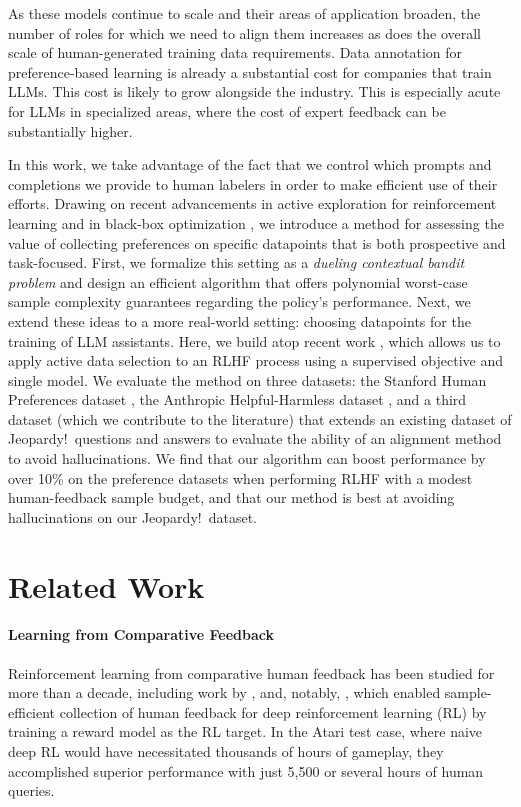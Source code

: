 \documentclass{article} \usepackage{iclr2023_conference,times}
\begin{document}
As these models continue to scale and their areas of application broaden, the number of roles for which we need to align them increases as does the overall scale of human-generated training data requirements.
Data annotation for preference-based learning is already a substantial cost for companies that train LLMs.
This cost is likely to grow alongside the industry.
This is especially acute for LLMs in specialized areas, where the cost of expert feedback can be substantially higher.



In this work, we take advantage of the fact that we control which prompts and completions we provide to human labelers in order to make efficient use of their efforts.
Drawing on recent advancements in active exploration for reinforcement learning \citep{li2023nearoptimal} and in black-box optimization \citep{xu2020zeroth}, we introduce a method for assessing the value of collecting preferences on specific datapoints that is both prospective and task-focused.
First, we formalize this setting as a \emph{dueling contextual bandit problem} and design an efficient algorithm that offers polynomial worst-case sample complexity guarantees regarding the policy's performance. 
Next, we extend these ideas to a more real-world setting: choosing datapoints for the training of LLM assistants.
Here, we build atop recent work \citep{dpo},
which allows us to apply active data selection to an RLHF process using a supervised objective and single model.
We evaluate the method on three datasets: the Stanford Human Preferences dataset \citep{pmlr-v162-ethayarajh22a}, the Anthropic Helpful-Harmless dataset \citep{bai2022training}, and a third dataset (which we contribute to the literature) that extends an existing dataset of Jeopardy!\ questions and answers to
evaluate the ability of an alignment method to avoid hallucinations. We find that our algorithm can boost performance by over 10\% on the preference datasets when performing RLHF with a modest human-feedback sample budget, and that our method is best at avoiding hallucinations on our Jeopardy!\ dataset.




%
 \vspace{-2mm}
\section{Related Work}
\vspace{-2mm}

\paragraph{Learning from Comparative Feedback}
Reinforcement learning from comparative human feedback has been studied for more than a decade, including work by \citet{furnkranzPreferenceRL}, \citet{akhourRobustPreferenceRL} and, notably, \citet{deepRLFromHumanPreferences}, which
enabled sample-efficient collection of human feedback for deep reinforcement learning (RL) by training a reward model as the RL target. In the Atari test case, where naive deep RL would have necessitated thousands of hours of gameplay, they accomplished superior performance with just 5,500 or several hours of human queries.
\end{document}
